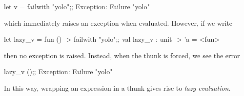 \documentclass{pset}
\begin{document}
\begin{ocaml}
  let v = failwith "yolo";;
  Exception: Failure "yolo"
\end{ocaml}
which immediately raises an exception when evaluated. However, if we
write
\begin{ocaml}
  let lazy_v = fun () -> failwith "yolo";;
  val lazy_v : unit -> 'a = <fun>
\end{ocaml}
then no exception is raised. Instead, when the thunk is forced, we see
the error
\begin{ocaml}
  lazy_v ();;
  Exception: Failure "yolo"
\end{ocaml}
In this way, wrapping an expression in a thunk gives rise to
\emph{lazy evaluation}.

\end{document}
